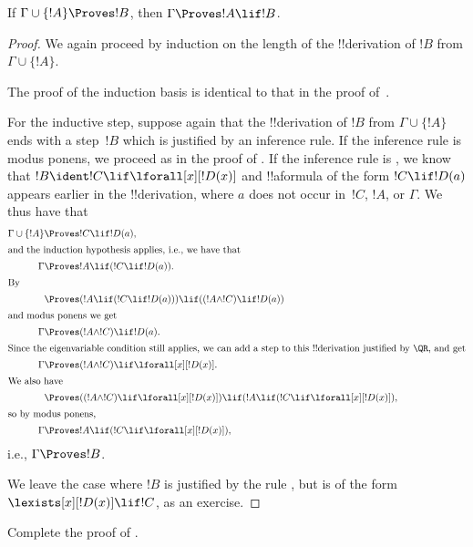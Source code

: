 \documentclass[../../../include/open-logic-section]{subfiles}
\begin{document}

\begin{thm}
 If $\Gamma \cup \{!A\} \Proves !B$,
then $\Gamma \Proves !A \lif !B$.
\end{thm}

\begin{proof}
We again proceed by induction on the length
of the !!{derivation} of $!B$ from $\Gamma \cup \{!A\}$.

The proof of the induction basis is identical to that in the proof
of~.

For the inductive step, suppose again that the !!{derivation} of $!B$
from $\Gamma \cup \{!A\}$ ends with a step~$!B$ which is justified by
an inference rule. If the inference rule is modus ponens, we proceed
as in the proof of . If the inference
rule is \QR, we know that $!B \ident !C \lif \lforall[x][!D(x)]$ and
!!a{formula} of the form $!C \lif !D(a)$ appears earlier in the
!!{derivation}, where $a$ does not occur in~$!C$, $!A$, or $\Gamma$. We
thus have that
\begin{align*}
  \Gamma \cup \{!A\} & \Proves !C \lif !D(a),\\
  \intertext{and the induction hypothesis applies, i.e., we have that}
    \Gamma & \Proves !A \lif (!C \lif !D(a)).\\
  \intertext{By}
  & \Proves (!A \lif (!C \lif !D(a))) \lif ((!A \land !C) \lif !D(a))\\
  \intertext{and modus ponens we get}
  \Gamma & \Proves (!A \land !C) \lif !D(a).\\
  \intertext{Since the eigenvariable condition still applies, we can add a step to this !!{derivation} justified by \QR, and get}
    \Gamma & \Proves (!A \land !C) \lif \lforall[x][!D(x)].\\
    \intertext{We also have}
    & \Proves ((!A \land !C) \lif \lforall[x][!D(x)]) \lif (!A \lif (!C \lif \lforall[x][!D(x)]),\\
    \intertext{so by modus ponens,}
    \Gamma & \Proves !A \lif (!C \lif \lforall[x][!D(x)]),
\end{align*}
i.e., $\Gamma \Proves !B$.

We leave the case where $!B$ is justified by the rule \QR, but is of
the form $\lexists[x][!D(x)] \lif !C$, as an exercise.
\end{proof}

\begin{prob}
  Complete the proof of .
\end{prob}
\end{document}
